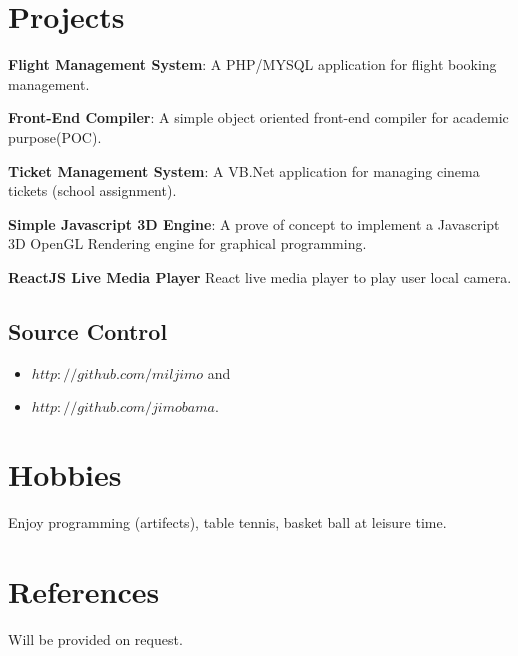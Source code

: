 \documentclass[11px]{article}
\begin{document}
\section*{Projects}
\textbf{Flight Management System}: A PHP/MYSQL application for flight booking management.

\textbf{Front-End Compiler}: A simple object oriented front-end compiler for academic purpose(POC).

\textbf{Ticket Management System}: A VB.Net application for managing cinema tickets (school assignment).

\textbf{Simple Javascript 3D Engine}: A prove of concept to implement a Javascript 3D OpenGL Rendering engine for graphical programming.

\textbf{ReactJS Live Media Player} React  live media player to play user local camera.



\subsection{Source Control}
\begin{itemize}
	\item $http://github.com/miljimo$ and
	\item  $  http://github.com/jimobama .$
\end{itemize} 
\hrulefill
\section{Hobbies}
Enjoy programming (artifects), table tennis, basket ball at leisure time.
\section*{References}
Will be provided on request.
\end{document}
